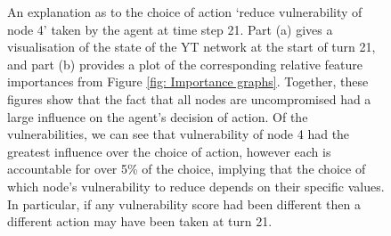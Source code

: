 \documentclass{article}
\begin{document}
\begin{figure}

\centering


\centering


    \caption{An explanation as to the choice of action `reduce vulnerability of node 4' taken by the agent at time step 21. Part (a) gives a visualisation of the state of the YT network at the start of turn 21, and part (b) provides a plot of the corresponding relative feature importances from Figure \ref{fig: Importance graphs}. Together, these figures show that the fact that all nodes are uncompromised had a large influence on the agent's decision of action. Of the vulnerabilities, we can see that vulnerability of node 4 had the greatest influence over the choice of action, however each is accountable for over 5\% of the choice, implying that the choice of which node's vulnerability to reduce depends on their specific values. In particular, if any vulnerability score had been different then a different action may have been taken at turn 21.}
    \label{fig: state_21}
\end{figure} 
\end{document}

